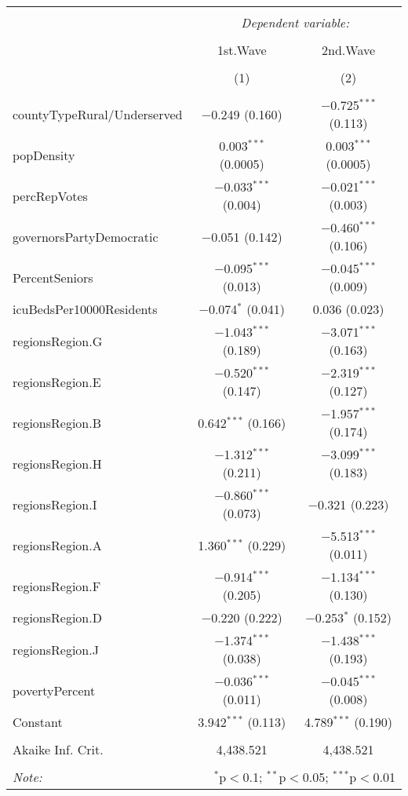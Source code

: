 
\begin{table}[!htbp] \centering 
  \caption{} 
  \label{} 
\begin{tabular}{@{\extracolsep{5pt}}lcc} 
\\[-1.8ex]\hline 
\hline \\[-1.8ex] 
 & \multicolumn{2}{c}{\textit{Dependent variable:}} \\ 
\cline{2-3} 
\\[-1.8ex] & 1st.Wave & 2nd.Wave \\ 
\\[-1.8ex] & (1) & (2)\\ 
\hline \\[-1.8ex] 
 countyTypeRural/Underserved & $-$0.249 (0.160) & $-$0.725$^{***}$ (0.113) \\ 
  popDensity & 0.003$^{***}$ (0.0005) & 0.003$^{***}$ (0.0005) \\ 
  percRepVotes & $-$0.033$^{***}$ (0.004) & $-$0.021$^{***}$ (0.003) \\ 
  governorsPartyDemocratic & $-$0.051 (0.142) & $-$0.460$^{***}$ (0.106) \\ 
  PercentSeniors & $-$0.095$^{***}$ (0.013) & $-$0.045$^{***}$ (0.009) \\ 
  icuBedsPer10000Residents & $-$0.074$^{*}$ (0.041) & 0.036 (0.023) \\ 
  regionsRegion.G & $-$1.043$^{***}$ (0.189) & $-$3.071$^{***}$ (0.163) \\ 
  regionsRegion.E & $-$0.520$^{***}$ (0.147) & $-$2.319$^{***}$ (0.127) \\ 
  regionsRegion.B & 0.642$^{***}$ (0.166) & $-$1.957$^{***}$ (0.174) \\ 
  regionsRegion.H & $-$1.312$^{***}$ (0.211) & $-$3.099$^{***}$ (0.183) \\ 
  regionsRegion.I & $-$0.860$^{***}$ (0.073) & $-$0.321 (0.223) \\ 
  regionsRegion.A & 1.360$^{***}$ (0.229) & $-$5.513$^{***}$ (0.011) \\ 
  regionsRegion.F & $-$0.914$^{***}$ (0.205) & $-$1.134$^{***}$ (0.130) \\ 
  regionsRegion.D & $-$0.220 (0.222) & $-$0.253$^{*}$ (0.152) \\ 
  regionsRegion.J & $-$1.374$^{***}$ (0.038) & $-$1.438$^{***}$ (0.193) \\ 
  povertyPercent & $-$0.036$^{***}$ (0.011) & $-$0.045$^{***}$ (0.008) \\ 
  Constant & 3.942$^{***}$ (0.113) & 4.789$^{***}$ (0.190) \\ 
 \hline \\[-1.8ex] 
Akaike Inf. Crit. & 4,438.521 & 4,438.521 \\ 
\hline 
\hline \\[-1.8ex] 
\textit{Note:}  & \multicolumn{2}{r}{$^{*}$p$<$0.1; $^{**}$p$<$0.05; $^{***}$p$<$0.01} \\ 
\end{tabular} 
\end{table} 
